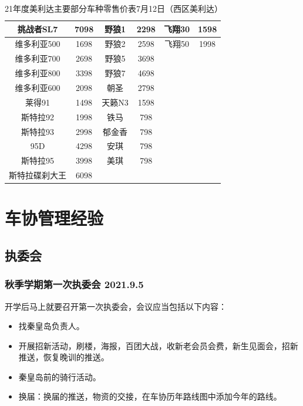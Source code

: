 \documentclass{ctexbook}
\begin{document}
\begin{table}[H]
\begin{tabular}{|c|c|c|c|c|c|}
    挑战者SL7                         & 7098       & 野狼1          & 2298       & 飞翔30         & 1598      \\ \hline
    维多利亚500                        & 1698       & 野狼2          & 2598       & 飞翔50         & 1998      \\ \hline
    维多利亚700                        & 2698       & 野狼5          & 3698       &              &           \\ \hline
    维多利亚800                        & 3398       & 野狼7          & 4698       &              &           \\ \hline
    维多利亚600                        & 2098       & 朝圣           & 2798       &              &           \\ \hline
    莱得91                           & 1498       & 天籁N3         & 1598       &              &           \\ \hline
    斯特拉92                          & 1998       & 铁马           & 798        &              &           \\ \hline
    斯特拉93                          & 2998       & 郁金香          & 798        &              &           \\ \hline
    95D                            & 4298       & 安琪           & 798        &              &           \\ \hline
    斯特拉95                          & 3998       & 美琪           & 798        &              &           \\ \hline
    斯特拉碟刹大王                        & 6098       &              &            &              &           \\ \hline
    \end{tabular}
    \caption{21年度美利达主要部分车种零售价表7月12日（西区美利达）}
\end{table} 
\chapter{车协管理经验}
\section{执委会}
\subsection{秋季学期第一次执委会 2021.9.5}
开学后马上就要召开第一次执委会，会议应当包括以下内容：
\begin{itemize}
    \item 找秦皇岛负责人。
    \item 开展招新活动，刷楼，海报，百团大战，收新老会员会费，新生见面会，招新推送，恢复晚训的推送。
    \item 秦皇岛前的骑行活动。
    \item 换届：换届的推送，物资的交接，在车协历年路线图中添加今年的路线。
\end{itemize}
\end{document}

